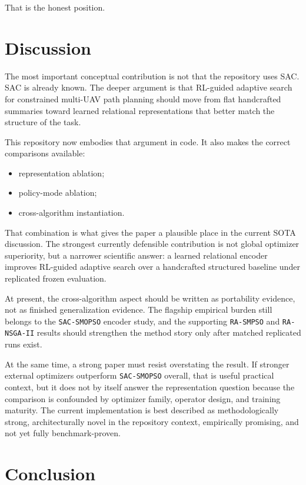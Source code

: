 \documentclass[a4paper,fleqn]{cas-sc}
\begin{document}
That is the honest position.

\section{Discussion}

The most important conceptual contribution is not that the repository uses SAC. SAC is already known. The deeper argument is that RL-guided adaptive search for constrained multi-UAV path planning should move from flat handcrafted summaries toward learned relational representations that better match the structure of the task.

This repository now embodies that argument in code. It also makes the correct comparisons available:
\begin{itemize}
\item representation ablation;
\item policy-mode ablation;
\item cross-algorithm instantiation.
\end{itemize}

That combination is what gives the paper a plausible place in the current SOTA discussion. The strongest currently defensible contribution is not global optimizer superiority, but a narrower scientific answer: a learned relational encoder improves RL-guided adaptive search over a handcrafted structured baseline under replicated frozen evaluation.

At present, the cross-algorithm aspect should be written as portability evidence, not as finished generalization evidence. The flagship empirical burden still belongs to the \texttt{SAC-SMOPSO} encoder study, and the supporting \texttt{RA-SMPSO} and \texttt{RA-NSGA-II} results should strengthen the method story only after matched replicated runs exist.

At the same time, a strong paper must resist overstating the result. If stronger external optimizers outperform \texttt{SAC-SMOPSO} overall, that is useful practical context, but it does not by itself answer the representation question because the comparison is confounded by optimizer family, operator design, and training maturity. The current implementation is best described as methodologically strong, architecturally novel in the repository context, empirically promising, and not yet fully benchmark-proven.

\section{Conclusion}
\end{document}
